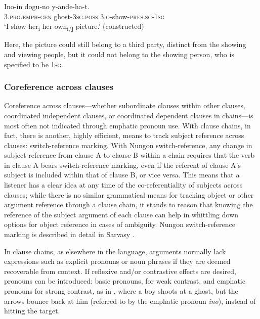 \documentclass[output=paper,colorlinks,citecolor=brown]{langscibook}
\begin{document}
\ea%
    \label{ex:sarvasy:27}
    \gll    Ino-in      dogu-no   y-ande-ha-t.\\
            \textsc{3.pro.emph-gen}  ghost\textsc{-3sg.poss} \textsc{3.o-}show\textsc{{}-pres.sg-1sg}\\
    \glt    ‘I show her\textsubscript{i} her own\textsubscript{i/j} picture.’ (constructed)
\z

Here, the picture could still belong to a third party, distinct from the showing and viewing people, but it could not belong to the showing person, who is specified to be 1\textsc{sg}.

\subsubsection{Coreference across clauses}\label{sec:sarvasy:3.3.4}

Coreference across clauses—whether subordinate clauses within other clauses, coordinated independent clauses, or coordinated dependent clauses in chains—is most often not indicated through emphatic pronoun use. With clause chains, in fact, there is another, highly efficient, means to track subject reference across clauses: switch-reference marking. With Nungon switch-reference, any change in subject reference from clause A to clause B within a chain requires that the verb in clause A bears switch-reference marking, even if the referent of clause A’s subject is included within that of clause B, or vice versa. This means that a listener has a clear idea at any time of the co-referentiality of subjects across clauses; while there is no similar grammatical means for tracking object or other argument reference through a clause chain, it stands to reason that knowing the reference of the subject argument of each clause can help in whittling down options for object reference in cases of ambiguity. Nungon switch-reference marking is described in detail in Sarvasy \citet{Sarvasy2015Imperative, Sarvasy2017Grammar}. 

In clause chains, as elsewhere in the language, arguments normally lack expressions such as explicit pronouns or noun phrases if they are deemed recoverable from context. If reflexive and/or contrastive effects are desired, pronouns can be introduced: basic pronouns, for weak contrast, and emphatic pronouns for strong contrast, as in , where a boy shoots at a ghost, but the arrows bounce back at him (referred to by the emphatic pronoun \textit{ino}), instead of hitting the target.
\end{document}
